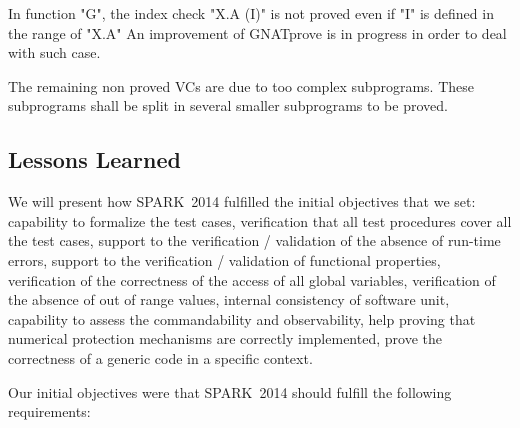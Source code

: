 \documentclass[10pt,a4paper,twocolumn]{article}
\newcommand{\gnatprove}{GNATprove\xspace}
\newcommand{\newspark}{SPARK~2014\xspace}
\begin{document}
In function "G", the index check "X.A (I)" is not proved even if "I" is defined in the range of "X.A"
An improvement of \gnatprove is in progress in order to deal with such case.

The remaining non proved VCs are due to too complex subprograms.
These subprograms shall be split in several smaller subprograms to be proved.
\fi

\subsection{Lessons Learned}

\ifdefined\abstractonly
We will present how \newspark fulfilled the initial objectives that we set:
capability to formalize the test cases, verification that all test procedures
cover all the test cases, support to the verification / validation of the
absence of run-time errors, support to the verification / validation of
functional properties, verification of the correctness of the access of all
global variables, verification of the absence of out of range values, internal
consistency of software unit, capability to assess the commandability and
observability, help proving that numerical protection mechanisms are correctly
implemented, prove the correctness of a generic code in a specific context.

\else
Our initial objectives were that \newspark should fulfill the following requirements:
\end{document}
